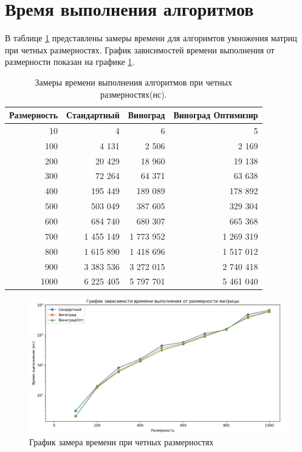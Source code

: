 \clearpage
\section{Время выполнения алгоритмов}

В таблице \ref{tab:time} представлены замеры времени для алгоримтов 
умножения матриц при четных размерностях. График зависимостей времени выполнения от размерности показан 
на графике \ref{img:dem}.
\begin{table}[!ht]
    \centering
    \caption{\label{tab:time}Замеры времени выполнения алгоритмов при четных размерностях(нс).}
    \begin{tabular}{|r|r|r|r|}
    \hline
        Размерность & Стандартный & Виноград & Виноград Оптимизир  \\ \hline
        10 & 4 & 6       &     5   \\ \hline
        100 & 4 131 &  2 506   & 2 169  \\ \hline
        200 & 20 429 &  18 960    & 19 138  \\ \hline
        300 & 72 264 & 64 371      &  63 638  \\ \hline
        400 & 195 449 & 189 089   &    178 892   \\ \hline
        500 & 503 049 & 387 605 &    329 304  \\ \hline
        600 & 684 740 & 680 307 &     665 368   \\ \hline
        700 & 1 455 149 & 1 773 952 &    1 269 319   \\ \hline
        800 & 1 615 890 & 1 418 696 &     1 517 012 \\ \hline
        900 & 3 383 536 & 3 272 015 &    2 740 418   \\ \hline
        1000 & 6 225 405 & 5 797 701 &   5 461 040  \\ \hline
    \end{tabular}
\end{table}


\begin{figure}[h]
	\centering
	\includegraphics[height=0.35\textheight]{img/graph.png}
	\caption{График замера времени при четных размерностях}
	\label{img:dem}
\end{figure}

